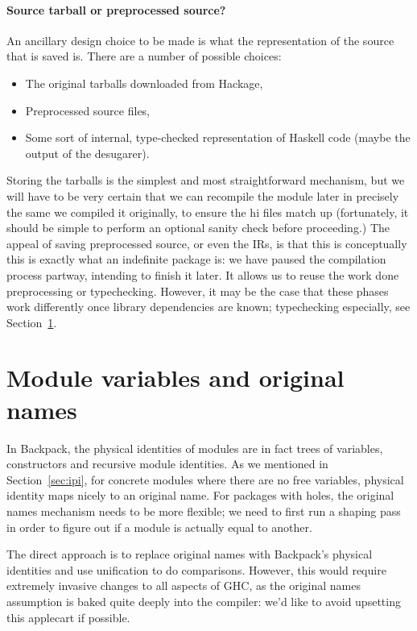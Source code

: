 \documentclass{article}
\begin{document}
\paragraph{Source tarball or preprocessed source?}  An ancillary design choice
to be made is what the representation of the source that is saved is.  There
are a number of possible choices:

\begin{itemize}
    \item The original tarballs downloaded from Hackage,
    \item Preprocessed source files,
    \item Some sort of internal, type-checked representation of Haskell code (maybe the output of the desugarer).
\end{itemize}

Storing the tarballs is the simplest and most straightforward mechanism,
but we will have to be very certain that we can recompile the module
later in precisely the same we compiled it originally, to ensure the hi
files match up (fortunately, it should be simple to perform an optional
sanity check before proceeding.) The appeal of saving preprocessed
source, or even the IRs, is that this is conceptually this is exactly
what an indefinite package is: we have paused the compilation process
partway, intending to finish it later. It allows us to reuse the work
done preprocessing or typechecking.  However, it may be the case that
these phases work differently once library dependencies are known; typechecking
especially, see Section~\ref{sec:variables}.

\section{Module variables and original names}\label{sec:variables}

In Backpack, the physical identities of modules are in fact trees of
variables, constructors and recursive module identities.  As we
mentioned in Section~\ref{sec:ipi}, for concrete modules where there are
no free variables, physical identity maps nicely to an original name.
For packages with holes, the original names mechanism needs to be more
flexible; we need to first run a shaping pass in order to figure out if
a module is actually equal to another.

The direct approach is to replace original names with Backpack's
physical identities and use unification to do comparisons.  However,
this would require extremely invasive changes to all aspects of GHC, as
the original names assumption is baked quite deeply into the compiler:
we'd like to avoid upsetting this applecart if possible.
\end{document}
